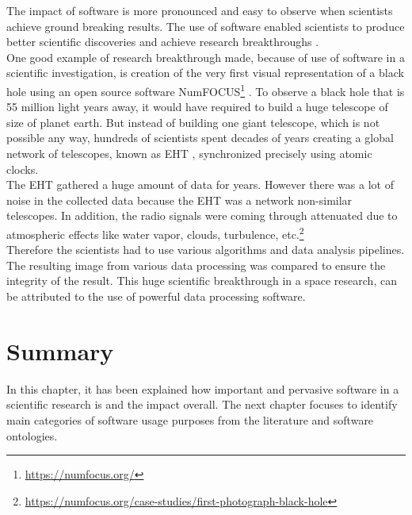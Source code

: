 The impact of software is more pronounced and easy to observe when scientists achieve ground breaking results. The use of software enabled scientists to produce better scientific discoveries and achieve research breakthroughs \citep{goble2014better}. \\

One good example of research breakthrough made, because of use of software in a scientific investigation,  is creation of the very first visual representation of a black hole using an open source software  NumFOCUS\footnote{\url{https://numfocus.org/}} \citep{event2019first}. To observe a black hole that is 55 million light years away, it would have required to build a huge telescope of size of planet earth. But instead of building one giant telescope, which is not possible any way, hundreds of scientists spent decades of years creating a global network of telescopes, known as  \ac{EHT} \citep{enwiki:1052167868}, synchronized precisely using atomic clocks. \\

The \ac{EHT} gathered a huge amount of data for years. However there was a lot of noise in the collected data because the \ac{EHT} was a network  non-similar telescopes. In addition, the radio signals were coming through attenuated due to atmospheric effects like water vapor, clouds, turbulence, etc.\footnote{\url{https://numfocus.org/case-studies/first-photograph-black-hole}}\\

Therefore the scientists had to use various algorithms and data analysis pipelines. The resulting image from various data processing was compared to ensure the integrity of the result. This huge scientific breakthrough in a space research, can be attributed to the use of powerful data processing software. 

\section{Summary}
\label{sec:Roles:Summary}

In this chapter, it has been explained how important and pervasive software in a scientific research is and the impact overall. The next chapter focuses to identify main categories of software usage purposes from the literature and  software ontologies.  




